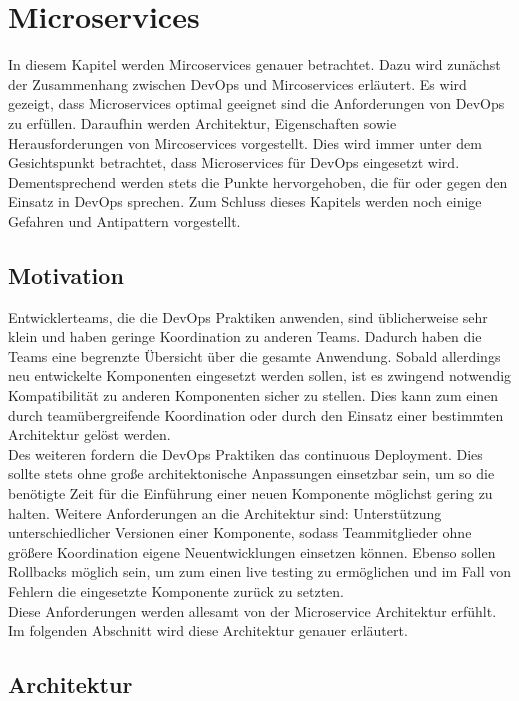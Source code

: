 \chapter{Microservices}
In diesem Kapitel werden Mircoservices genauer betrachtet. Dazu wird zunächst der Zusammenhang zwischen DevOps und Mircoservices erläutert. Es wird gezeigt, dass Microservices optimal geeignet sind die Anforderungen von DevOps zu erfüllen. Daraufhin werden Architektur, Eigenschaften sowie Herausforderungen von Mircoservices vorgestellt. Dies wird immer unter dem Gesichtspunkt betrachtet, dass Microservices für DevOps eingesetzt wird. Dementsprechend werden stets die Punkte hervorgehoben, die für oder gegen den Einsatz in DevOps sprechen. Zum Schluss dieses Kapitels werden noch einige Gefahren und Antipattern vorgestellt.

\section{Motivation}

Entwicklerteams, die die DevOps Praktiken anwenden, sind üblicherweise sehr klein und haben geringe Koordination zu anderen Teams. Dadurch haben die Teams eine begrenzte Übersicht über die gesamte Anwendung. Sobald allerdings neu entwickelte Komponenten eingesetzt werden sollen, ist es zwingend notwendig Kompatibilität zu anderen Komponenten sicher zu stellen. Dies kann zum einen durch teamübergreifende Koordination oder durch den Einsatz einer bestimmten Architektur gelöst werden. \\
Des weiteren fordern die DevOps Praktiken das continuous Deployment. Dies sollte stets ohne große architektonische Anpassungen einsetzbar sein, um so die benötigte Zeit für die Einführung einer neuen Komponente möglichst gering zu halten. Weitere Anforderungen an die Architektur sind: Unterstützung unterschiedlicher Versionen einer Komponente, sodass Teammitglieder ohne größere Koordination eigene Neuentwicklungen einsetzen können. Ebenso sollen Rollbacks möglich sein, um zum einen live testing zu ermöglichen und im Fall von Fehlern die eingesetzte Komponente zurück zu setzten.\\

Diese Anforderungen werden allesamt von der Microservice Architektur erfühlt. Im folgenden Abschnitt wird diese Architektur genauer erläutert. 
 


\section{Architektur}

